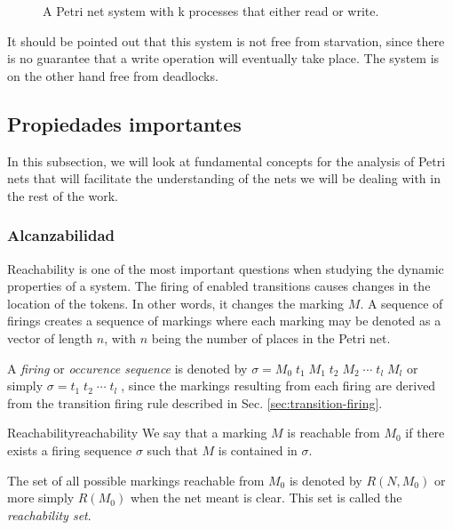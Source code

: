 \begin{figure}[!htbp]
      \centering
      
      \caption{A Petri net system with k processes that either read or write.}
      \label{fig:readers-writers-example}
\end{figure}

It should be pointed out that this system is not free from starvation,
since there is no guarantee that a write operation will eventually take place.
The system is on the other hand free from deadlocks.

\subsection{Propiedades importantes}

In this subsection, we will look at fundamental concepts for the analysis of Petri nets
that will facilitate the understanding of the nets we will be dealing with in the rest of the work.

\subsubsection{Alcanzabilidad}
\label{sec:reachability}

Reachability is one of the most important questions
when studying the dynamic properties of a system.
The firing of enabled transitions causes changes in the location of the tokens.
In other words, it changes the marking $M$.
A sequence of firings creates a sequence of markings
where each marking may be denoted as a vector of length $n$,
with $n$ being the number of places in the Petri net.

A \emph{firing} or \emph{occurence sequence} is denoted by
$ \sigma = M_0\; t_1\; M_1\; t_2\; M_2\; \cdots\; t_l\; M_l$ or simply
$ \sigma = t_1\; t_2\; \cdots\; t_l\; $, since the markings
resulting from each firing are derived
from the transition firing rule described in Sec. \ref{sec:transition-firing}.

\begin{definition}{Reachability}{reachability}
      We say that a marking $M$ is reachable from $M_0$
      if there exists a firing sequence $\sigma$ such that $M$ is contained in $\sigma$.
\end{definition}

The set of all possible markings reachable from $M_0$ is denoted by $R(N, M_0)$ or more simply
$R(M_0)$ when the net meant is clear.
This set is called the \emph{reachability set}.

